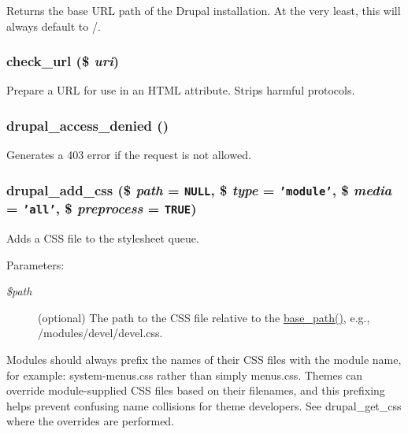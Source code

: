 Returns the base URL path of the Drupal installation. At the very least, this will always default to /. \hypertarget{common_8inc_c024315b69035ef05c33674838707919}{
\subsubsection[{check\_\-url}]{\setlength{\rightskip}{0pt plus 5cm}check\_\-url (\$ {\em uri})}}
\label{common_8inc_c024315b69035ef05c33674838707919}


Prepare a URL for use in an HTML attribute. Strips harmful protocols. \hypertarget{common_8inc_0bbff371f9373002e71f2e1347fcf481}{
\subsubsection[{drupal\_\-access\_\-denied}]{\setlength{\rightskip}{0pt plus 5cm}drupal\_\-access\_\-denied ()}}
\label{common_8inc_0bbff371f9373002e71f2e1347fcf481}


Generates a 403 error if the request is not allowed. \hypertarget{common_8inc_21f9e8d23b62a313faddaf211d7cc610}{
\subsubsection[{drupal\_\-add\_\-css}]{\setlength{\rightskip}{0pt plus 5cm}drupal\_\-add\_\-css (\$ {\em path} = {\tt NULL}, \/  \$ {\em type} = {\tt 'module'}, \/  \$ {\em media} = {\tt 'all'}, \/  \$ {\em preprocess} = {\tt TRUE})}}
\label{common_8inc_21f9e8d23b62a313faddaf211d7cc610}


Adds a CSS file to the stylesheet queue.

\begin{Desc}
\item[Parameters:]
\begin{description}
\item[{\em \$path}](optional) The path to the CSS file relative to the \hyperlink{common_8inc_e227697e9c239f09fd7e36f71afde771}{base\_\-path()}, e.g., /modules/devel/devel.css.\end{description}
\end{Desc}
Modules should always prefix the names of their CSS files with the module name, for example: system-menus.css rather than simply menus.css. Themes can override module-supplied CSS files based on their filenames, and this prefixing helps prevent confusing name collisions for theme developers. See drupal\_\-get\_\-css where the overrides are performed.

